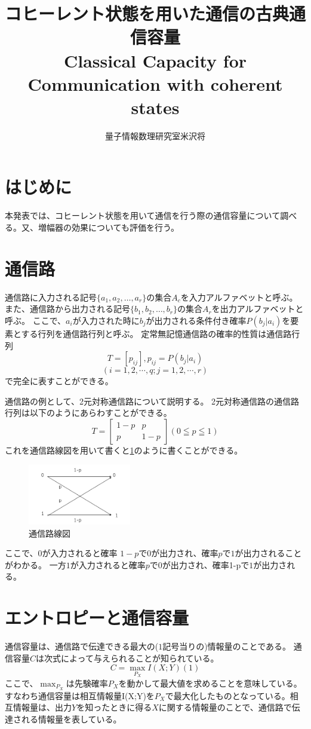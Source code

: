 \documentclass[a4j,twocolumn]{jarticle}
\title{\vspace{-2em}コヒーレント状態を用いた通信の古典通信容量\\
\vspace{0.5cm}
\normalsize{Classical Capacity for Communication with coherent states}}
\date{}
\author{量子情報数理研究室\hspace{50mm}米沢将}
\def \figref #1{\figurename\ref{#1}}
\begin{document}
\maketitle
\thispagestyle{empty}
\section{はじめに}
本発表では、コヒーレント状態を用いて通信を行う際の通信容量について調べる。又、増幅器の効果についても評価を行う。

\section{通信路}
通信路に入力される記号$\{a_1,a_2,…,a_r\}$の集合$A_c$を入力アルファベットと呼ぶ。また、通信路から出力される記号$\{b_1,b_2,…,b_r\}$の集合$A_r$を出力アルファベットと呼ぶ。
ここで、$a_i$が入力された時に$b_j$が出力される条件付き確率$P(b_j|a_i)$を要素とする行列を通信路行列と呼ぶ。
定常無記憶通信路の確率的性質は通信路行列
$$T=[p_{ij}],p_{ij}=P(b_j|a_i)$$ $$(i=1,2,\cdots ,q;j=1,2,\cdots,r)$$
で完全に表すことができる。



通信路の例として、2元対称通信路について説明する。
2元対称通信路の通信路行列は以下のようにあらわすことができる。
$$
T=\begin{bmatrix}
1-p&p\\
p&1-p
\end{bmatrix}
(0≦p≦1)$$ 
これを通信路線図を用いて書くと\figref{Fig2_1}のように書くことができる。

    \begin{figure}[H]
        \centering   
        \includegraphics[width=0.4\textwidth]{img/Fig1.png}
        \caption[sample image (png)]{通信路線図}
        \label{Fig2_1}
    \end{figure}


ここで、$0$が入力されると確率 $1-p$で$0$が出力され、確率$p$で$1$が出力されることがわかる。
一方$1$が入力されると確率$p$で$0$が出力され、確率1-pで$1$が出力される。

\section{エントロピーと通信容量}
通信容量は、通信路で伝達できる最大の($1$記号当りの)情報量のことである。
通信容量$C$は次式によって与えられることが知られている。
$$
C=\max_{P_X}I(X;Y)　　(1)
$$
ここで、$\max_{P_X}$は先験確率$P_X$を動かして最大値を求めることを意味している。
すなわち通信容量は相互情報量I(X;Y)を$P_X$で最大化したものとなっている。相互情報量は、出力$Y$を知ったときに得る$X$に関する情報量のことで、通信路で伝達される情報量を表している。
\end{document}
